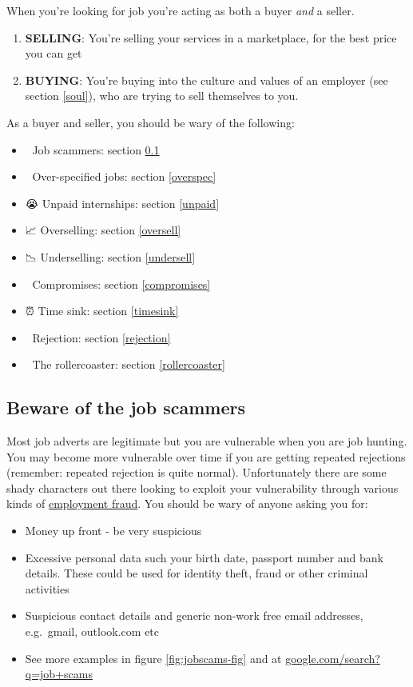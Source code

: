 \documentclass[
]{book}
\providecommand{\tightlist}{%
  \setlength{\itemsep}{0pt}\setlength{\parskip}{0pt}}
\begin{document}
When you're looking for job you're acting as both a buyer \emph{and} a seller.

\begin{enumerate}
\def\labelenumi{\arabic{enumi}.}
\tightlist
\item
  \textbf{SELLING}: You're selling your services in a marketplace, for the best price you can get
\item
  \textbf{BUYING}: You're buying into the culture and values of an employer (see section \ref{soul}), who are trying to sell themselves to you.
\end{enumerate}

As a buyer and seller, you should be wary of the following:

\begin{itemize}
\tightlist
\item
  🤥 Job scammers: section \ref{scams}
\item
  🤣 Over-specified jobs: section \ref{overspec}
\item
  😭 Unpaid internships: section \ref{unpaid}
\item
  📈 Overselling: section \ref{oversell}
\item
  📉 Underselling: section \ref{undersell}
\item
  🤔 Compromises: section \ref{compromises}
\item
  ⏰ Time sink: section \ref{timesink}
\item
  🤮 Rejection: section \ref{rejection}
\item
  🎢 The rollercoaster: section \ref{rollercoaster}
\end{itemize}

\hypertarget{scams}{%
\subsection{Beware of the job scammers}\label{scams}}

Most job adverts are legitimate but you are vulnerable when you are job hunting. You may become more vulnerable over time if you are getting repeated rejections (remember: repeated rejection is quite normal). Unfortunately there are some shady characters out there looking to exploit your vulnerability through various kinds of \href{https://en.wikipedia.org/wiki/Employment_fraud}{employment fraud}. \citep{jobscammers} You should be wary of anyone asking you for:

\begin{itemize}
\tightlist
\item
  Money up front - be very suspicious
\item
  Excessive personal data such your birth date, passport number and bank details. These could be used for identity theft, fraud or other criminal activities
\item
  Suspicious contact details and generic non-work free email addresses, e.g.~gmail, outlook.com etc \citep{jobscammers2}
\item
  See more examples in figure \ref{fig:jobscams-fig} and at \href{https://www.google.com/search?q=job+scams}{google.com/search?q=job+scams}
\end{itemize}
\end{document}
